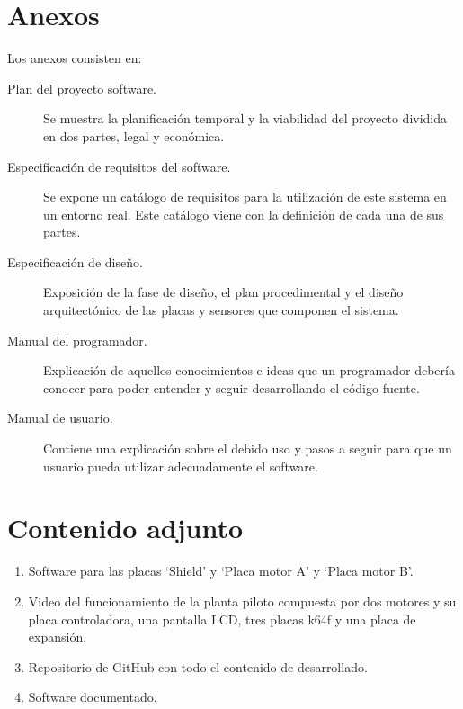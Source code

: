 \section{Anexos}\label{sec:anexos}
Los anexos consisten en:
\begin{description}
	\item[Plan del proyecto software.] Se muestra la planificación temporal y la viabilidad del proyecto dividida en dos partes, legal y económica.

	\item[Especificación de requisitos del software.] Se expone un catálogo de requisitos para la utilización de este sistema en un entorno real. Este catálogo viene con la definición de cada una de sus partes.

	\item[Especificación de diseño.] Exposición de la fase de diseño, el plan procedimental y el diseño arquitectónico de las placas y sensores que componen el sistema.

	\item[Manual del programador.] Explicación de aquellos conocimientos e ideas que un programador debería conocer para poder entender y seguir desarrollando el código fuente.

	\item[Manual de usuario.] Contiene una explicación sobre el debido uso y pasos a seguir para que un usuario pueda utilizar adecuadamente el software.
\end{description}

\section{Contenido adjunto}\label{sec:Contenido adjunto}
\begin{enumerate}
\item Software para las placas `Shield' y `Placa motor A' y `Placa motor B'.
\item Video del funcionamiento de la planta piloto compuesta por dos motores y su placa controladora, una pantalla LCD, tres placas k64f y una placa de expansión.
\item Repositorio de GitHub \cite{EOD1001} con todo el contenido de desarrollado.
\item Software documentado.
\end{enumerate}

